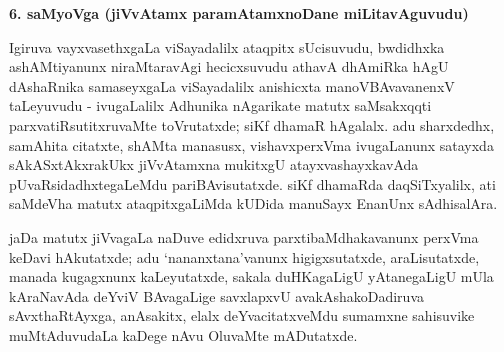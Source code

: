 \bigskip
\begin{center}
{\Large\bf 6. saMyoVga (jiVvAtamx paramAtamxnoDane miLitavAguvudu)}
\end{center}

Igiruva vayxvasethxgaLa viSayadalilx ataqpitx sUcisuvudu, bwdidhxka ashAMtiyanunx niraMtaravAgi hecicxsuvudu athavA dhAmiRka hAgU dAshaRnika samaseyxgaLa viSayadalilx anishicxta manoVBAvavanenxV taLeyuvudu - ivugaLalilx Adhunika nAgarikate matutx saMsakxqqti parxvatiRsutitxruvaMte toVrutatxde; siKf dhamaR hAgalalx. adu sharxdedhx, samAhita citatxte, shAMta manasusx, vishavxperxVma ivugaLanunx satayxda sAkASxtAkxrakUkx jiVvAtamxna mukitxgU atayxvashayxkavAda pUvaRsidadhxtegaLeMdu pariBAvisutatxde. siKf dhamaRda daqSiTxyalilx, ati saMdeVha matutx ataqpitxgaLiMda kUDida manuSayx EnanUnx sAdhisalAra.

jaDa matutx jiVvagaLa naDuve edidxruva parxtibaMdhakavanunx perxVma keDavi hAkutatxde; adu `nananxtana'vanunx higigxsutatxde, araLisutatxde, manada kugagxnunx kaLeyutatxde, sakala duHKagaLigU yAtanegaLigU mUla kAraNavAda deYviV BAvagaLige savxlapxvU avakAshakoDadiruva sAvxthaRtAyxga, anAsakitx, elalx deYvacitatxveMdu sumamxne sahisuvike muMtAduvudaLa kaDege nAvu OluvaMte mADutatxde.

